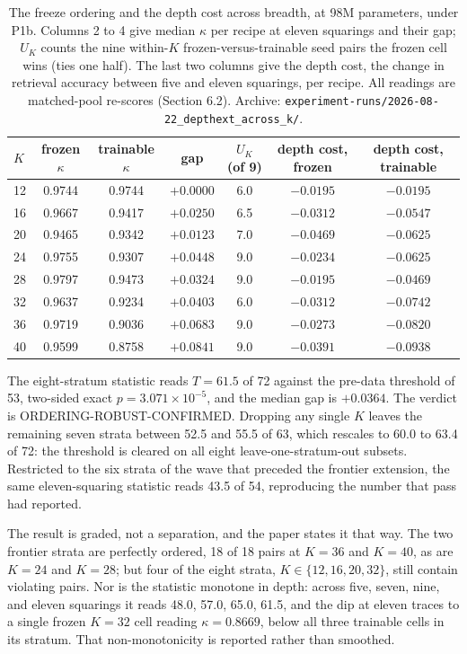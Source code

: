\begin{table}[t]
\centering
\caption{The freeze ordering and the depth cost across breadth, at 98M parameters, under P1b. Columns 2 to 4 give median $\kappa$ per recipe at eleven squarings and their gap; $U_K$ counts the nine within-$K$ frozen-versus-trainable seed pairs the frozen cell wins (ties one half). The last two columns give the depth cost, the change in retrieval accuracy between five and eleven squarings, per recipe. All readings are matched-pool re-scores (Section 6.2). Archive: \texttt{experiment-runs/2026-08-22\_depthext\_across\_k/}.}
\label{tab:breadth-ordering}
\small
\begin{tabular}{lcccccc}
\toprule
$K$ & frozen $\kappa$ & trainable $\kappa$ & gap & $U_K$ (of 9) & depth cost, frozen & depth cost, trainable \\
\midrule
12 & 0.9744 & 0.9744 & $+0.0000$ & 6.0 & $-0.0195$ & $-0.0195$ \\
16 & 0.9667 & 0.9417 & $+0.0250$ & 6.5 & $-0.0312$ & $-0.0547$ \\
20 & 0.9465 & 0.9342 & $+0.0123$ & 7.0 & $-0.0469$ & $-0.0625$ \\
24 & 0.9755 & 0.9307 & $+0.0448$ & 9.0 & $-0.0234$ & $-0.0625$ \\
28 & 0.9797 & 0.9473 & $+0.0324$ & 9.0 & $-0.0195$ & $-0.0469$ \\
32 & 0.9637 & 0.9234 & $+0.0403$ & 6.0 & $-0.0312$ & $-0.0742$ \\
36 & 0.9719 & 0.9036 & $+0.0683$ & 9.0 & $-0.0273$ & $-0.0820$ \\
40 & 0.9599 & 0.8758 & $+0.0841$ & 9.0 & $-0.0391$ & $-0.0938$ \\
\bottomrule
\end{tabular}
\end{table}

The eight-stratum statistic reads $T = 61.5$ of 72 against the pre-data
threshold of 53, two-sided exact $p = 3.071 \times 10^{-5}$, and the
median gap is $+0.0364$. The verdict is ORDERING-ROBUST-CONFIRMED.
Dropping any single $K$ leaves the remaining seven strata between 52.5
and 55.5 of 63, which rescales to 60.0 to 63.4 of 72: the threshold is
cleared on all eight leave-one-stratum-out subsets. Restricted to the
six strata of the wave that preceded the frontier extension, the same
eleven-squaring statistic reads 43.5 of 54, reproducing the number that
pass had reported.

The result is graded, not a separation, and the paper states it that
way. The two frontier strata are perfectly ordered, 18 of 18 pairs at
$K{=}36$ and $K{=}40$, as are $K{=}24$ and $K{=}28$; but four of the
eight strata, $K \in \{12, 16, 20, 32\}$, still contain violating pairs.
Nor is the statistic monotone in depth: across five, seven, nine, and
eleven squarings it reads 48.0, 57.0, 65.0, 61.5, and the dip at eleven
traces to a single frozen $K{=}32$ cell reading $\kappa = 0.8669$, below
all three trainable cells in its stratum. That non-monotonicity is
reported rather than smoothed.

